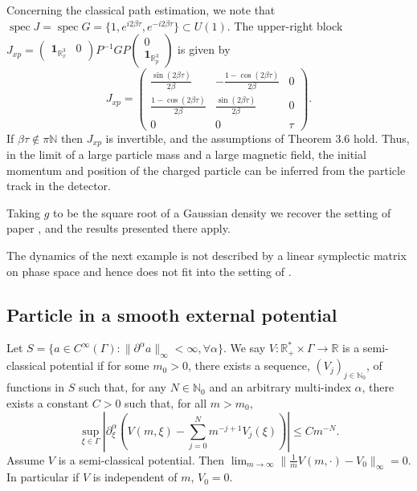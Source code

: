 \documentclass[11pt]{article}
\begin{document}
Concerning the classical path estimation, we note that $\operatorname{spec} J=\operatorname{spec} G=\{1,e^{i2\beta\tau},e^{-i2\beta\tau}\}\subset U(1)$. The upper-right block 
$J_{xp}=\begin{pmatrix}\mathbf{1}_{\mathbb R_x^3}& 0\end{pmatrix}P^{-1}GP\begin{pmatrix}0\\\mathbf{1}_{\mathbb R_p^3}\end{pmatrix}$ 
is given by
$$J_{xp}=\begin{pmatrix}
	\frac{\operatorname{sin}(2\beta \tau)}{2\beta} & -\frac{1-\cos(2\beta\tau)}{2\beta} & 0\\
	\frac{1-\cos(2\beta\tau)}{2\beta}& \frac{\operatorname{sin}(2\beta \tau)}{2\beta} &0\\
	0&0&\tau
\end{pmatrix}.$$
If $\beta\tau\notin \pi\mathbb N$ then $J_{xp}$ is invertible, and the assumptions of Theorem 3.6 hold. Thus, 
in the limit of a large particle mass and a large magnetic field, the initial momentum and position of the charged 
particle can be inferred from the particle track in the detector. 

Taking $g$ to be the square root of a Gaussian density we recover the setting of paper \cite{BBFF}, 
and the results presented there apply.

\medskip
The dynamics of the next example is not described by a linear symplectic matrix on phase space and hence does not fit 
into the setting of \cite{BBFF}.

\subsection{Particle in a smooth external potential}
Let $S=\{ a\in C^{\infty}(\Gamma): \|\partial^{\alpha}a\|_\infty<\infty, \forall \alpha\}$. We say 
$V:\mathbb R_+^*\times \Gamma\to \mathbb R$ is a semi-classical potential if for some $m_0>0$, 
there exists a sequence, $(V_j)_{j\in \mathbb N_0}$, of functions in $S$ such that, for any $N\in \mathbb N_0$ and 
an arbitrary multi-index $\alpha$, there exists a constant $C>0$ such that, for all $m>m_0$,
$$\sup_{\xi\in \Gamma}\left|\partial_\xi^\alpha\left(V(m,\xi)-\sum_{j=0}^Nm^{-j+1}V_j(\xi)\right)\right|\leq Cm^{-N}.$$
Assume $V$ is a semi-classical potential. Then $\lim_{m\to\infty}\|\frac1m V(m,\cdot)- V_0\|_\infty=0$. In particular 
if $V$ is independent of $m$, $V_0=0$.
\end{document}
